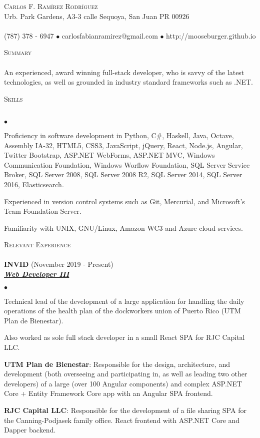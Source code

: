 \documentclass{article}
\newcommand{\lineunder}{\vspace*{-8pt} \\ \hspace*{-18pt} \hrulefill \\}
\newcommand{\header}[1]{{\hspace*{-15pt}\vspace*{6pt} \textsc{#1}} \vspace*{-6pt} \lineunder}
\newcommand{\employer}[3]{{ \textbf{#1} (#2)\\ \underline{\textbf{\emph{#3}}}\\  }}
\newcommand{\contact}[3]{
\vspace*{-8pt}
\begin{center}
{\LARGE \scshape {#1}}\\
#2 \lineunder 
#3
\end{center}
\vspace*{-8pt}
}
\newenvironment{achievements}{\begin{list}{$\bullet$}{\topsep 0pt \itemsep -2pt}}{\vspace*{4pt}\end{list}}
\begin{document}
\small
\smallskip
\vspace*{-44pt}

\contact{Carlos F. Ram\'irez Rodr\'iguez}
{Urb. Park Gardens, A3-3 calle Sequoya, San Juan PR 00926}
{(787) 378 - 6947 $\bullet$ carlosfabianramirez@gmail.com $\bullet$ http://mooseburger.github.io}

\header{Summary}
An experienced, award winning full-stack developer, who is savvy of the latest technologies, as well as grounded in industry standard frameworks such as .NET.  

\header{Skills}
\begin{achievements}
\item Proficiency in software development in Python, C\string#, Haskell, Java, Octave, Assembly IA-32, HTML5, CSS3, JavaScript, jQuery, React, Node.js, Angular, Twitter Bootstrap, ASP.NET WebForms, ASP.NET MVC, Windows Communication Foundation, Windows Worflow Foundation, SQL Server Service Broker, SQL Server 2008, SQL Server 2008 R2, SQL Server 2014, SQL Server 2016, Elasticsearch.
\item Experienced in version control systems such as Git, Mercurial, and Microsoft's Team Foundation Server.
\item Familiarity with UNIX, GNU/Linux, Amazon WC3 and Azure cloud services.
\end{achievements}

\header{Relevant Experience}

\employer{INVID}{November 2019 - Present}{Web Developer III}
	\begin{achievements}
	\item Technical lead of the development of a large application for handling the daily operations of the health plan of the dockworkers union of Puerto Rico (UTM Plan de Bienestar). 
	\item Also worked as sole full stack developer in a small React SPA for RJC Capital LLC.
	\item \textbf{UTM Plan de Bienestar}: Responsible for the design, architecture, and development (both overseeing and participating in, as well as leading two other developers) of a large (over 100 Angular components) and complex ASP.NET Core + Entity Framework Core app with an Angular SPA frontend.
	\item \textbf{RJC Capital LLC}: Responsible for the development of a file sharing SPA for the Canning-Podjasek family office. React frontend with ASP.NET Core and Dapper backend.
	\end{achievements}
\end{document}
